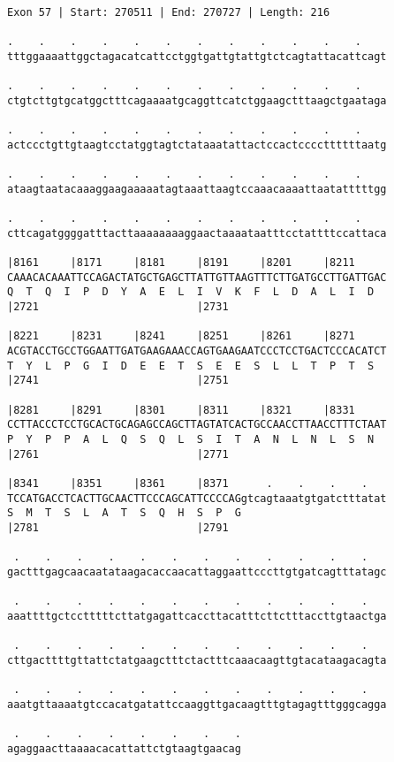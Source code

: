 \documentclass{article}
\begin{document}
\begin{Verbatim}
Exon 57 | Start: 270511 | End: 270727 | Length: 216
 
.    .    .    .    .    .    .    .    .    .    .    .    
tttggaaaattggctagacatcattcctggtgattgtattgtctcagtattacattcagt
  
.    .    .    .    .    .    .    .    .    .    .    .    
ctgtcttgtgcatggctttcagaaaatgcaggttcatctggaagctttaagctgaataga
  
.    .    .    .    .    .    .    .    .    .    .    .    
actccctgttgtaagtcctatggtagtctataaatattactccactccccttttttaatg
  
.    .    .    .    .    .    .    .    .    .    .    .    
ataagtaatacaaaggaagaaaaatagtaaattaagtccaaacaaaattaatatttttgg
  
.    .    .    .    .    .    .    .    .    .    .    .    
cttcagatggggatttacttaaaaaaaaggaactaaaataatttcctattttccattaca
  
|8161     |8171     |8181     |8191     |8201     |8211     
CAAACACAAATTCCAGACTATGCTGAGCTTATTGTTAAGTTTCTTGATGCCTTGATTGAC
Q  T  Q  I  P  D  Y  A  E  L  I  V  K  F  L  D  A  L  I  D  
|2721                         |2731                         
  
|8221     |8231     |8241     |8251     |8261     |8271     
ACGTACCTGCCTGGAATTGATGAAGAAACCAGTGAAGAATCCCTCCTGACTCCCACATCT
T  Y  L  P  G  I  D  E  E  T  S  E  E  S  L  L  T  P  T  S  
|2741                         |2751                         
  
|8281     |8291     |8301     |8311     |8321     |8331     
CCTTACCCTCCTGCACTGCAGAGCCAGCTTAGTATCACTGCCAACCTTAACCTTTCTAAT
P  Y  P  P  A  L  Q  S  Q  L  S  I  T  A  N  L  N  L  S  N  
|2761                         |2771                         
  
|8341     |8351     |8361     |8371      .    .    .    .   
TCCATGACCTCACTTGCAACTTCCCAGCATTCCCCAGgtcagtaaatgtgatctttatat
S  M  T  S  L  A  T  S  Q  H  S  P  G                       
|2781                         |2791                         
  
 .    .    .    .    .    .    .    .    .    .    .    .   
gactttgagcaacaatataagacaccaacattaggaattcccttgtgatcagtttatagc
  
 .    .    .    .    .    .    .    .    .    .    .    .   
aaattttgctcctttttcttatgagattcaccttacatttcttctttaccttgtaactga
  
 .    .    .    .    .    .    .    .    .    .    .    .   
cttgacttttgttattctatgaagctttctactttcaaacaagttgtacataagacagta
  
 .    .    .    .    .    .    .    .    .    .    .    .   
aaatgttaaaatgtccacatgatattccaaggttgacaagtttgtagagtttgggcagga
  
 .    .    .    .    .    .    .    .
agaggaacttaaaacacattattctgtaagtgaacag
\end{Verbatim}
\end{document}
